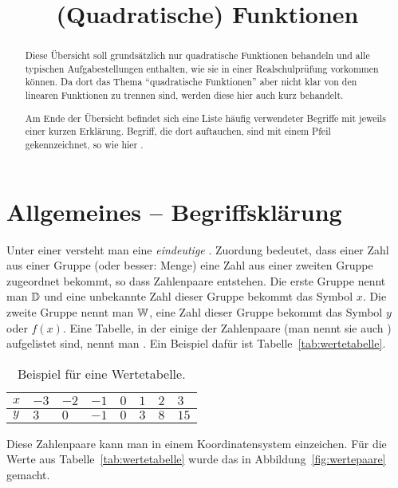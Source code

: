 \documentclass{arbeitsblatt}
\title{(Quadratische) Funktionen}
\begin{document}
\maketitle

\begin{abstract}
  Diese Übersicht soll grundsätzlich nur quadratische Funktionen behandeln und
  alle typischen Aufgabestellungen enthalten, wie sie in einer
  Realschulprüfung vorkommen können.  Da dort das Thema "`quadratische
  Funktionen"' aber nicht klar von den linearen Funktionen zu trennen sind,
  werden diese hier auch kurz behandelt.
  
  Am Ende der Übersicht befindet sich eine Liste häufig verwendeter Begriffe
  mit jeweils einer kurzen Erklärung.  Begriff, die dort auftauchen, sind mit
  einem Pfeil gekennzeichnet, so wie hier .
\end{abstract}

\tableofcontents

\section{Allgemeines -- Begriffsklärung}

Unter einer  versteht man eine \emph{eindeutige}
.  Zuordung bedeutet, dass einer Zahl aus einer Gruppe
(oder besser: Menge) eine Zahl aus einer zweiten Gruppe zugeordnet bekommt, so
dass Zahlenpaare entstehen.  Die erste Gruppe nennt man
 $\mathbb{D}$ und eine unbekannte Zahl dieser
Gruppe bekommt das Symbol $x$.  Die zweite Gruppe nennt man
 $\mathbb{W}$, eine Zahl dieser Gruppe bekommt das Symbol
$y$ oder $f(x)$.  Eine Tabelle, in der einige der Zahlenpaare (man nennt sie
auch ) aufgelistet sind, nennt man .  Ein
Beispiel dafür ist Tabelle~\vref{tab:wertetabelle}.

\begin{table}
  \centering
  \caption{Beispiel für eine Wertetabelle.}
  \label{tab:wertetabelle}
\end{table}

Diese Zahlenpaare kann man in einem Koordinatensystem einzeichen.  Für die
Werte aus Tabelle~\vref{tab:wertetabelle} wurde das in
Abbildung~\vref{fig:wertepaare} gemacht.
\end{document}
